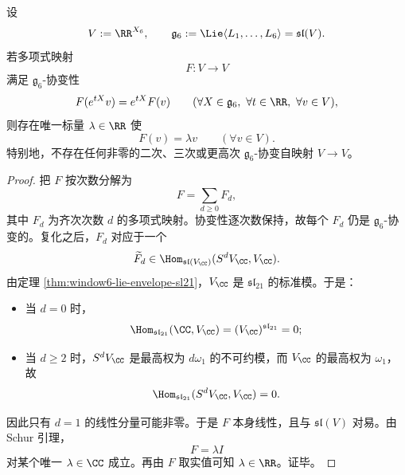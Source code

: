 \begin{theorem}\label{thm:conclusion-window6-polynomial-equivariant-selfmap-collapse}
设
\[
V:=\RR^{X_6},
\qquad
\mathfrak g_6:=\Lie\langle L_1,\dots,L_6\rangle=\mathfrak{sl}(V).
\]
若多项式映射
\[
F:V\to V
\]
满足 \(\mathfrak g_6\)-协变性
\[
F(e^{tX}v)=e^{tX}F(v)
\qquad
(\forall X\in\mathfrak g_6,\ \forall t\in\RR,\ \forall v\in V),
\]
则存在唯一标量 \(\lambda\in\RR\) 使
\[
F(v)=\lambda v
\qquad (\forall v\in V).
\]
特别地，不存在任何非零的二次、三次或更高次 \(\mathfrak g_6\)-协变自映射 \(V\to V\)。
\end{theorem}
\begin{proof}
把 \(F\) 按次数分解为
\[
F=\sum_{d\ge 0}F_d,
\]
其中 \(F_d\) 为齐次次数 \(d\) 的多项式映射。协变性逐次数保持，故每个 \(F_d\) 仍是 \(\mathfrak g_6\)-协变的。复化之后，\(F_d\) 对应于一个
\[
\widetilde F_d\in \Hom_{\mathfrak{sl}(V_{\CC})}(S^dV_{\CC},V_{\CC}).
\]
由定理 \ref{thm:window6-lie-envelope-sl21}，\(V_{\CC}\) 是 \(\mathfrak{sl}_{21}\) 的标准模。于是：
\begin{itemize}
  \item 当 \(d=0\) 时，
  \[
  \Hom_{\mathfrak{sl}_{21}}(\CC,V_{\CC})=(V_{\CC})^{\mathfrak{sl}_{21}}=0;
  \]
  \item 当 \(d\ge 2\) 时，\(S^dV_{\CC}\) 是最高权为 \(d\omega_1\) 的不可约模，而 \(V_{\CC}\) 的最高权为 \(\omega_1\)，故
  \[
  \Hom_{\mathfrak{sl}_{21}}(S^dV_{\CC},V_{\CC})=0.
  \]
\end{itemize}
因此只有 \(d=1\) 的线性分量可能非零。于是 \(F\) 本身线性，且与 \(\mathfrak{sl}(V)\) 对易。由 Schur 引理，
\[
F=\lambda I
\]
对某个唯一 \(\lambda\in\CC\) 成立。再由 \(F\) 取实值可知 \(\lambda\in\RR\)。证毕。
\end{proof}


